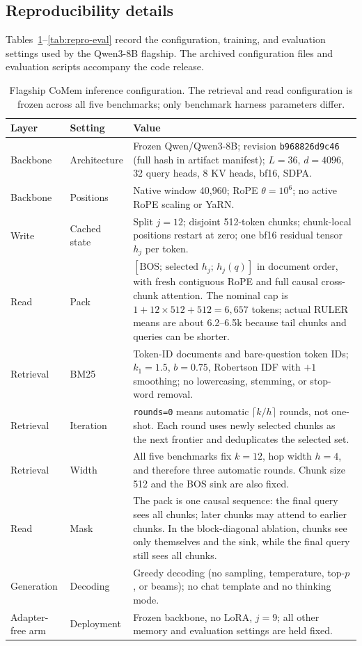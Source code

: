 \subsection{Reproducibility details}
\label{app:reproducibility}
Tables~\ref{tab:repro-config}--\ref{tab:repro-eval} record the configuration,
training, and evaluation settings used by the Qwen3-8B flagship. The archived
configuration files and evaluation scripts accompany the code release.

\begin{table}[!t]
\centering
\small
\renewcommand{\arraystretch}{0.92}
\setlength{\tabcolsep}{3pt}
\begin{tabular}{@{}p{}p{}p{}@{}}
\toprule
\textbf{Layer} & \textbf{Setting} & \textbf{Value} \\
\midrule
Backbone & Architecture & Frozen Qwen/Qwen3-8B; revision \texttt{b968826d9c46} (full hash in artifact manifest); $L{=}36$, $d{=}4096$, 32 query heads, 8 KV heads, bf16, SDPA. \\
Backbone & Positions & Native window 40,960; RoPE $\theta{=}10^6$; no active RoPE scaling or YaRN. \\
Write & Cached state & Split $j{=}12$; disjoint 512-token chunks; chunk-local positions restart at zero; one bf16 residual tensor $h_j$ per token. \\
Read & Pack & $[\mathrm{BOS};\,\text{selected }h_j;\,h_j(q)]$ in document order, with fresh contiguous RoPE and full causal cross-chunk attention. The nominal cap is $1+12\!\times\!512+512=6{,}657$ tokens; actual RULER means are about 6.2--6.5k because tail chunks and queries can be shorter. \\
Retrieval & BM25 & Token-ID documents and bare-question token IDs; $k_1{=}1.5$, $b{=}0.75$, Robertson IDF with $+1$ smoothing; no lowercasing, stemming, or stop-word removal. \\
Retrieval & Iteration & \texttt{rounds=0} means automatic $\lceil k/h\rceil$ rounds, not one-shot. Each round uses newly selected chunks as the next frontier and deduplicates the selected set. \\
Retrieval & Width & All five benchmarks fix $k{=}12$, hop width $h{=}4$, and therefore three automatic rounds. Chunk size 512 and the BOS sink are also fixed. \\
Read & Mask & The pack is one causal sequence: the final query sees all chunks; later chunks may attend to earlier chunks. In the block-diagonal ablation, chunks see only themselves and the sink, while the final query still sees all chunks. \\
Generation & Decoding & Greedy decoding (no sampling, temperature, top-$p$, or beams); no chat template and no thinking mode. \\
Adapter-free arm & Deployment & Frozen backbone, no LoRA, $j{=}9$; all other memory and evaluation settings are held fixed. \\
\bottomrule
\end{tabular}
\caption{Flagship CoMem inference configuration. The retrieval and read
configuration is frozen across all five benchmarks; only benchmark harness
parameters differ.}
\label{tab:repro-config}
\end{table}

